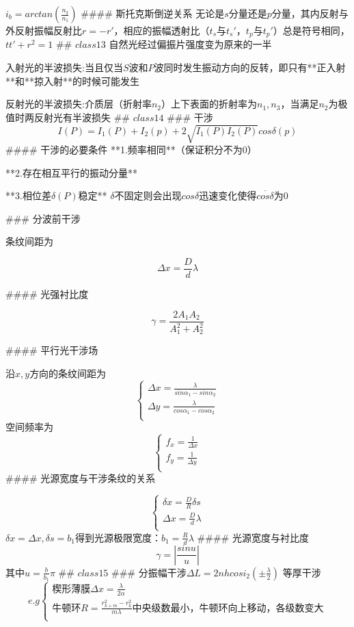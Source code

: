 \documentclass[12pt]{ctexart}
\begin{document}
$i_b=arctan(\frac{n_2}{n_1})$
#### 斯托克斯倒逆关系
无论是$s$分量还是$p$分量，其内反射与外反射振幅反射比$r=-r'$，相应的振幅透射比（$t_s$与$t_s'$，$t_p$与$t_p'$）总是符号相同， $tt'+r^2=1$
## $class13$
自然光经过偏振片强度变为原来的一半

入射光的半波损失:当且仅当$S$波和$P$波同时发生振动方向的反转，即只有**正入射**和**掠入射**的时候可能发生

反射光的半波损失:介质层（折射率$n_2$）上下表面的折射率为$n_1,n_3$，当满足$n_2$为极值时两反射光有半波损失
## $class14$
### 干涉
$$I(P)=I_1(P)+I_2(p)+2\sqrt{I_1(P)I_2(P)}cos\delta(p)$$
#### 干涉的必要条件
**1.频率相同**（保证积分不为0）

**2.存在相互平行的振动分量**

**3.相位差$\delta(P)$稳定** $\delta$不固定则会出现$cos\delta$迅速变化使得$\overline{cos\delta}$为0

### 分波前干涉

条纹间距为

$$\Delta x=\frac{D}{d}\lambda$$

#### 光强衬比度

$$\gamma=\frac{2A_1A_2}{A_1^2+A_2^2}$$

#### 平行光干涉场

沿$x,y$方向的条纹间距为
$$\begin{cases}
\Delta x=\frac{\lambda}{sin\alpha_1-sin\alpha_2}\\
\Delta y=\frac{\lambda}{cos\alpha_1-cos\alpha_2}\\
\end{cases}$$
空间频率为
$$\begin{cases}
f_x=\frac{1}{\Delta x}\\
f_y=\frac{1}{\Delta y}\\
\end{cases}$$
#### 光源宽度与干涉条纹的关系

$$\begin{cases}
\delta x=\frac{D}{R}\delta s\\
\Delta x=\frac{D}{d}\lambda\\
\end{cases}$$
$\delta x=\Delta x,\delta s=b_1$得到光源极限宽度：$b_1=\frac{R}{d}\lambda$
#### 光源宽度与衬比度
$$\gamma=|\frac{sinu}{u}|$$
其中$u=\frac{b}{b_1}\pi$
## $class15$
### 分振幅干涉$\Delta L=2nhcosi_2(\pm\frac{\lambda}{2})$
等厚干涉
$$e.g\begin{cases}
楔形薄膜\Delta x=\frac{\lambda}{2\alpha}\\
牛顿环R=\frac{r^2_{k+m}-r^2_k}{m\lambda}中央级数最小，牛顿环向上移动，各级数变大\\
\end{cases}$$
\end{document}
